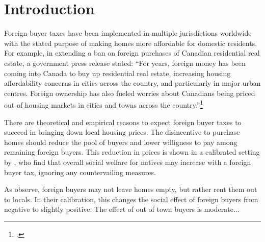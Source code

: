 \documentclass[12pt]{article}
\begin{document}
\section{Introduction}

Foreign buyer taxes have been implemented in multiple jurisdictions worldwide with the stated purpose of making homes more affordable for domestic residents. For example, in extending a ban on foreign purchases of Canadian residential real estate, a government press release stated: ``For years, foreign money has been coming into Canada to buy up residential real estate, increasing housing affordability concerns in cities across the country, and particularly in major urban centres. Foreign ownership has also fueled worries about Canadians being priced out of housing markets in cities and towns across the country.''\footnote{\textcite{gOC}.}

There are theoretical and empirical reasons to expect foreign buyer taxes to succeed in bringing down local housing prices. The disincentive to purchase homes should reduce the pool of buyers and lower willigness to pay among remaining foreign buyers. This reduction in prices is shown in a calibrated setting by \textcite{favilukisVanNieuwerburgh}, who find that overall social welfare for natives may increase with a foreign buyer tax, ignoring any countervailing measures. 

As \textcite{favilukisVanNieuwerburgh} observe, foreign buyers may not leave homes empty, but rather rent them out to locals. In their calibration, this changes the social effect of foreign buyers from negative to slightly positive. The effect of out of town buyers is moderate...
\end{document}
